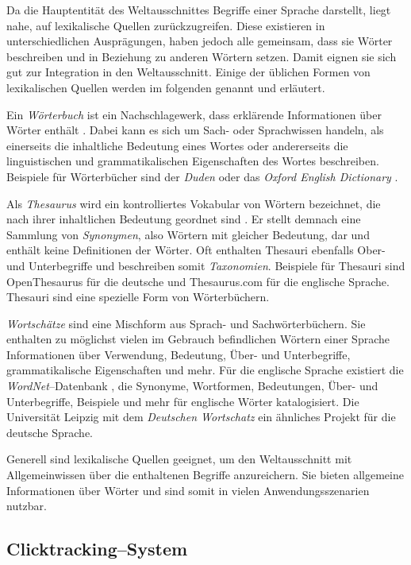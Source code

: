 Da die Hauptentität des Weltausschnittes Begriffe einer Sprache darstellt, liegt nahe, auf lexikalische Quellen zurückzugreifen. Diese existieren in unterschiedlichen Ausprägungen, haben jedoch alle gemeinsam, dass sie Wörter beschreiben und in Beziehung zu anderen Wörtern setzen. Damit eignen sie sich gut zur Integration in den Weltausschnitt. Einige der üblichen Formen von lexikalischen Quellen werden im folgenden genannt und erläutert.

Ein \emph{Wörterbuch} ist ein Nachschlagewerk, dass erklärende Informationen über Wörter enthält \cite{hk2003}. Dabei kann es sich um Sach- oder Sprachwissen handeln, als einerseits die inhaltliche Bedeutung eines Wortes oder andererseits die linguistischen und grammatikalischen Eigenschaften des Wortes beschreiben. Beispiele für Wörterbücher sind der \emph{Duden} \cite{duden} oder das \emph{Oxford English Dictionary} \cite{oed2010}.

Als \emph{Thesaurus} wird ein kontrolliertes Vokabular von Wörtern bezeichnet, die nach ihrer inhaltlichen Bedeutung geordnet sind \cite[S. 2]{ac2004}. Er stellt demnach eine Sammlung von \emph{Synonymen}, also Wörtern mit gleicher Bedeutung, dar und enthält keine Definitionen der Wörter. Oft enthalten Thesauri ebenfalls Ober- und Unterbegriffe und beschreiben somit \emph{Taxonomien}. Beispiele für Thesauri sind OpenThesaurus \cite{ot2013} für die deutsche und Thesaurus.com \cite{tc2013} für die englische Sprache. Thesauri sind eine spezielle Form von Wörterbüchern.

\emph{Wortschätze} sind eine Mischform aus Sprach- und Sachwörterbüchern. Sie enthalten zu möglichst vielen im Gebrauch befindlichen Wörtern einer Sprache Informationen über Verwendung, Bedeutung, Über- und Unterbegriffe, grammatikalische Eigenschaften und mehr. Für die englische Sprache existiert die \emph{WordNet}--Datenbank \cite{wn2013, fc1998}, die Synonyme, Wortformen, Bedeutungen, Über- und Unterbegriffe, Beispiele und mehr für englische Wörter katalogisiert. Die Universität Leipzig mit dem \emph{Deutschen Wortschatz} ein ähnliches Projekt \cite{ws2013} für die deutsche Sprache.

Generell sind lexikalische Quellen geeignet, um den Weltausschnitt mit Allgemeinwissen über die enthaltenen Begriffe anzureichern. Sie bieten allgemeine Informationen über Wörter und sind somit in vielen Anwendungsszenarien nutzbar.

\subsection{Clicktracking--System}
\label{clicktracking_theo}

